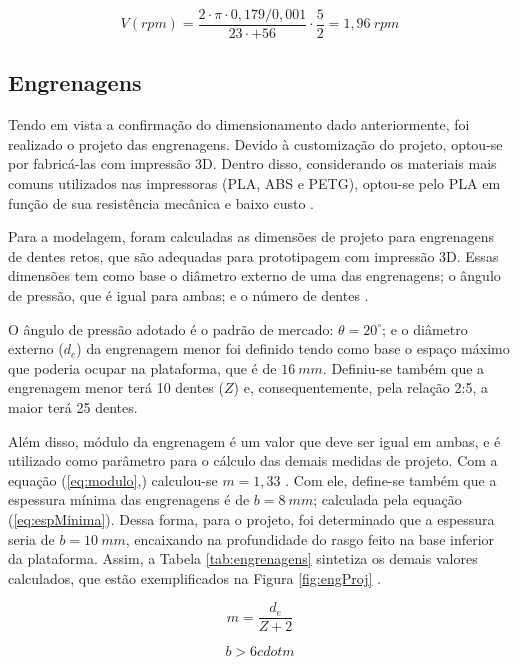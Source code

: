 \begin{equation}
	V(rpm) = \dfrac{2\cdot\pi\cdot0,179/0,001}{23\cdot+56}\cdot\dfrac{5}{2} = 1,96~rpm
	\label{eq:speed}
\end{equation}



\subsection{Engrenagens}

Tendo em vista a confirmação do dimensionamento dado anteriormente, foi realizado o projeto das engrenagens. Devido à customização do projeto, optou-se por fabricá-las com impressão 3D. Dentro disso, considerando os materiais mais comuns utilizados nas impressoras (PLA, ABS e PETG), optou-se pelo PLA em função de sua resistência mecânica e baixo custo \cite{site:3dprinted}. 

Para a modelagem, foram calculadas as dimensões de projeto para engrenagens de dentes retos, que são adequadas para prototipagem com impressão 3D. Essas dimensões tem como base o diâmetro externo de uma das engrenagens; o ângulo de pressão, que é igual para ambas; e o número de dentes \cite{site:3dprinted}.  


O ângulo de pressão adotado é o padrão de mercado: $ \theta = 20^{\circ} $; e o diâmetro externo ($ d_e $) da engrenagem menor foi definido tendo como base o espaço máximo que poderia ocupar na plataforma, que é de $ 16~mm $. Definiu-se também que a engrenagem menor terá 10 dentes ($ Z $) e, consequentemente, pela relação 2:5, a maior terá 25 dentes.


Além disso, módulo da engrenagem é um valor que deve ser igual em ambas, e é utilizado como parâmetro para o cálculo das demais medidas de projeto. Com a equação (\ref{eq:modulo},) calculou-se $ m = 1,33 $ . Com ele, define-se também que a espessura mínima das engrenagens é de  $ b = 8~mm $; calculada pela equação (\ref{eq:espMinima}). Dessa forma, para o projeto, foi determinado que a espessura seria de $ b = 10~mm $, encaixando na profundidade do rasgo feito na base inferior da plataforma. Assim, a Tabela \ref{tab:engrenagens} sintetiza os demais valores calculados, que estão exemplificados na Figura \ref{fig:engProj} \cite{tcc:lucasEngrenagem}.

\begin{equation}
	m = \dfrac{d_e}{Z+2}
	\label{eq:modulo}
\end{equation}

\begin{equation}
	b > 6 cdot m
	\label{eq:espMinima}
\end{equation}

